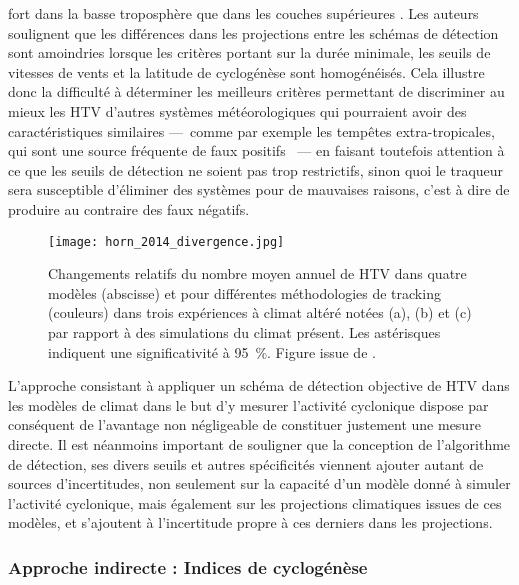 \documentclass[../main.tex]{subfiles}
\begin{document}
fort dans la basse troposphère que dans les couches supérieures \parencite{horn_tracking_2014}. Les auteurs soulignent que les différences dans les projections
entre les schémas de détection sont amoindries lorsque les critères portant sur la durée minimale, les seuils de vitesses de vents et la latitude de cyclogénèse
sont homogénéisés. Cela illustre donc la difficulté à déterminer les meilleurs critères permettant de discriminer au mieux les HTV d'autres systèmes
météorologiques qui pourraient avoir des caractéristiques similaires ---~comme par exemple les tempêtes extra-tropicales, qui sont une source fréquente de faux
positifs \parencite[][voir aussi \cref{sec:filtrage_mid_latitudes}]{dulac_assessing_2023}~--- en faisant toutefois attention à ce que les seuils de détection ne
soient pas trop restrictifs, sinon quoi le traqueur sera susceptible d'éliminer des systèmes pour de mauvaises raisons, c'est à dire de produire au
contraire des faux négatifs. 

\begin{figure}[tb]
    \centering
    \texttt{[image: horn\_2014\_divergence.jpg]}
    \caption{Changements relatifs du nombre moyen annuel de HTV dans quatre modèles (abscisse) et pour différentes méthodologies de tracking (couleurs) dans
    trois expériences à climat altéré notées (a), (b) et (c) par rapport à des simulations du climat présent. Les astérisques indiquent une significativité à
    \SI{95}{\percent}. Figure issue de \cite{horn_tracking_2014}.}
    \label{fig:horn_2014_projections}
\end{figure}

L'approche consistant à appliquer un schéma de détection objective de HTV dans les modèles de climat dans le but d'y mesurer l'activité cyclonique dispose par
conséquent de l'avantage non négligeable de constituer justement une mesure directe. Il est néanmoins important de souligner que la conception de l'algorithme de
détection, ses divers seuils et autres spécificités viennent ajouter autant de sources d'incertitudes, non seulement sur la capacité d'un modèle donné à simuler
l'activité cyclonique, mais également sur les projections climatiques issues de ces modèles, et s'ajoutent à l'incertitude propre à ces derniers dans les
projections.

\subsubsection{Approche indirecte : Indices de cyclogénèse}\label{sec:intro_indices}
\end{document}
